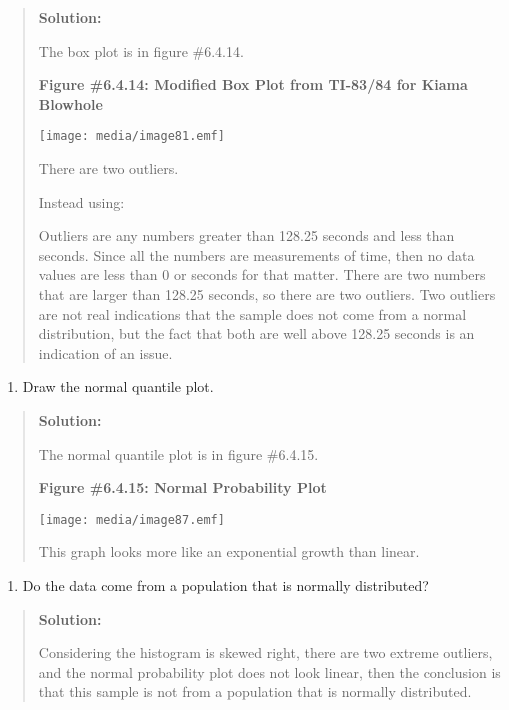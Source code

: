 \documentclass[]{book}
\providecommand{\tightlist}{%
  \setlength{\itemsep}{0pt}\setlength{\parskip}{0pt}}
\begin{document}
\begin{quote}
\textbf{Solution:}

The box plot is in figure \#6.4.14.

\textbf{Figure \#6.4.14: Modified Box Plot from TI-83/84 for Kiama
Blowhole}

\texttt{[image: media/image81.emf]}

There are two outliers.

Instead using:

Outliers are any numbers greater than 128.25 seconds and less than
seconds. Since all the numbers are measurements of time, then no data
values are less than 0 or seconds for that matter. There are two
numbers that are larger than 128.25 seconds, so there are two
outliers. Two outliers are not real indications that the sample does
not come from a normal distribution, but the fact that both are well
above 128.25 seconds is an indication of an issue.
\end{quote}

\begin{enumerate}
\def\labelenumi{\alph{enumi}.}
\setcounter{enumi}{3}
\tightlist
\item
  Draw the normal quantile plot.
\end{enumerate}

\begin{quote}
\textbf{Solution:}

The normal quantile plot is in figure \#6.4.15.

\textbf{Figure \#6.4.15: Normal Probability Plot}

\texttt{[image: media/image87.emf]}

This graph looks more like an exponential growth than linear.
\end{quote}

\begin{enumerate}
\def\labelenumi{\alph{enumi}.}
\setcounter{enumi}{4}
\tightlist
\item
  Do the data come from a population that is normally distributed?
\end{enumerate}

\begin{quote}
\textbf{Solution:}

Considering the histogram is skewed right, there are two extreme
outliers, and the normal probability plot does not look linear, then
the conclusion is that this sample is not from a population that is
normally distributed.
\end{quote}
\end{document}
